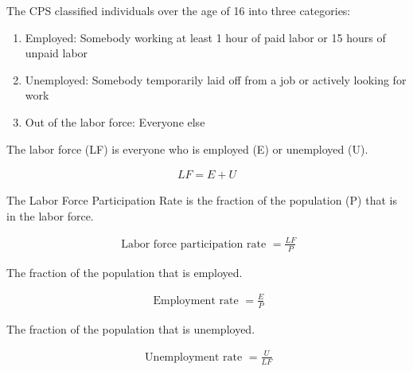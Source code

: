The CPS classified individuals over the 
age of 16 into three categories:

\begin{enumerate}
    \item Employed: Somebody working 
        at least 1 hour of paid labor or 15 hours of unpaid labor
    \item Unemployed: Somebody temporarily laid off 
        from a job or actively looking for work
    \item Out of the labor force: Everyone else
\end{enumerate}

\begin{definition} 
    The labor force (LF) is everyone who is employed (E) or unemployed (U).

    \begin{align}
        L F=E+U
    \end{align}

\end{definition}

\begin{definition} 

    The Labor Force Participation Rate is the fraction of the population (P) that is in the labor force.

    \begin{align}
        \text { Labor force participation rate }=\frac{L F}{P}
    \end{align}

\end{definition}


\begin{definition} 
    
    The fraction of the population that is employed.

    \begin{align}
        \text { Employment rate }=\frac{E}{P}
    \end{align}

\end{definition}

\begin{definition} 

    The fraction of the population that is unemployed.

    \begin{align}
        \text { Unemployment rate }=\frac{U}{L F}
    \end{align}
    
\end{definition}

